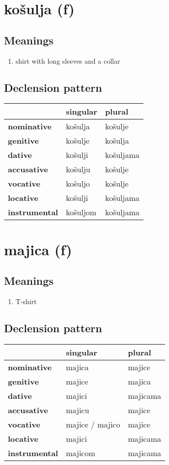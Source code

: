 \filbreak
\section{košulja (f)}
\subsection*{Meanings}
\begin{enumerate}
\item shirt with long sleeves and a collar
\end{enumerate}
\subsection*{Declension pattern}
\begin{tabularx}{\linewidth}{Xll}
\toprule
{} &  singular &     plural \\
\midrule
\textbf{nominative  } &   košulja &    košulje \\
\textbf{genitive    } &   košulje &    košulja \\
\textbf{dative      } &   košulji &  košuljama \\
\textbf{accusative  } &   košulju &    košulje \\
\textbf{vocative    } &   košuljo &    košulje \\
\textbf{locative    } &   košulji &  košuljama \\
\textbf{instrumental} &  košuljom &  košuljama \\
\bottomrule
\end{tabularx}

\filbreak
\section{majica (f)}
\subsection*{Meanings}
\begin{enumerate}
\item T-shirt
\end{enumerate}
\subsection*{Declension pattern}
\begin{tabularx}{\linewidth}{Xll}
\toprule
{} &         singular &    plural \\
\midrule
\textbf{nominative  } &           majica &    majice \\
\textbf{genitive    } &           majice &    majica \\
\textbf{dative      } &           majici &  majicama \\
\textbf{accusative  } &           majicu &    majice \\
\textbf{vocative    } &  majice / majico &    majice \\
\textbf{locative    } &           majici &  majicama \\
\textbf{instrumental} &          majicom &  majicama \\
\bottomrule
\end{tabularx}

